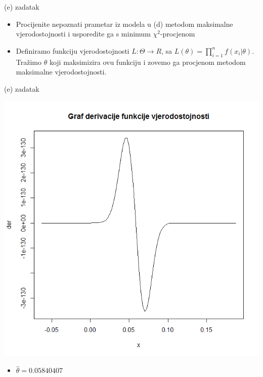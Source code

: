 \documentclass{beamer}
\begin{document}
\begin{frame}{(e) zadatak}
\begin{itemize}
\item Procijenite nepoznati prametar iz modela u (d) metodom maksimalne vjerodostojnosti
i usporedite ga s minimum $ \chi ^2$-procjenom
\item Definiramo funkciju vjerodostojnosti $L:\Theta \rightarrow R$, sa $L(\theta)=\prod_{i=1}^{n} f(x_{i}|\theta)$. Tražimo $\theta$ koji maksimizira ovu funkciju i zovemo ga procjenom metodom maksimalne vjerodostojnosti.
\end{itemize}
\end{frame}


\begin{frame}{(e) zadatak}
\begin{center}
\includegraphics[scale=0.25]{5.png}\\
\end{center}
\begin{itemize}
\item $\hat{\theta} = 0.05840407$
\end{itemize}
\end{frame}
\end{document}
